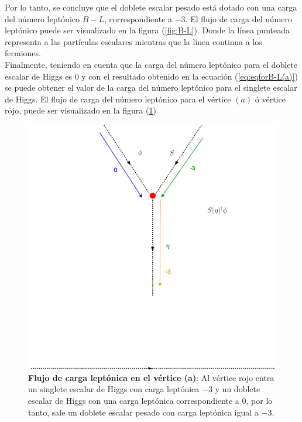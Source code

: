 \documentclass[12pt]{article}
\begin{document}
Por lo tanto, se concluye que el doblete escalar pesado está dotado con una carga del número leptónico $B-L$, correspondiente a $-3$. El flujo de carga del número leptónico puede ser visualizado en la figura (\ref{fig:B-L}). Donde la línea punteada representa a las partículas escalares mientras que la línea continua a los fermiones. \\



Finalmente, teniendo en cuenta que la carga del número leptónico para el doblete escalar de Higgs es $0$ y con el resultado obtenido en la ecuación (\ref{eq:eqforB-L(a)}) se puede obtener el valor de la carga del número leptónico para el singlete escalar de Higgs. El flujo de carga del número leptónico para el vértice $(a)$ ó vértice rojo, puede ser visualizado en la figura (\ref{fig:B-L(b)})


\begin{figure}[h!]
  \begin{center}
  \includegraphics[scale=0.5]{Flujodriagram(b)(B_L).pdf}
\caption{{\textbf{Flujo de carga leptónica en el vértice (a)}: Al vértice rojo entra un singlete escalar de Higgs  con carga leptónica  $-3$ y un doblete escalar de Higgs con una carga leptónica correspondiente a $0$, por lo tanto,  sale un doblete escalar pesado con carga leptónica igual a $-3$. }}
\label{fig:B-L(b)}
\end{center}
\end{figure}
\end{document}
